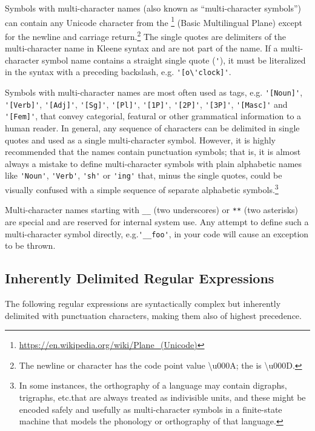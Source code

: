 \vspace{.5cm}

\noindent
Symbols with multi-character names (also known as ``multi-character symbols'') can contain any
Unicode character from the
\footnote{\url{https://en.wikipedia.org/wiki/Plane_(Unicode)}}
(Basic Multilingual Plane) except for the newline and
carriage return.\footnote{The newline or  character has the code
point value \textbackslash{}u000A; the  is \textbackslash{}u000D.}  The
single quotes are delimiters of the multi-character 
name in Kleene syntax and are not part of the name.  If a
multi-character symbol name contains a straight single quote
(\verb!'!), it must be literalized in the syntax with a preceding backslash, e.g.\@
\verb!'[o\'clock]'!.

Symbols with multi-character names are most often used as tags, e.g.\@
\verb!'[Noun]'!, \verb!'[Verb]'!, \verb!'[Adj]'!, \verb!'[Sg]'!,
\verb!'[Pl]'!, \verb!'[1P]'!, \verb!'[2P]'!, \verb!'[3P]'!,
\verb!'[Masc]'! and \verb!'[Fem]'!, that convey categorial,
featural or other grammatical information to a human reader.  In general, any sequence of
 characters can be delimited in single quotes and used as a
single multi-character symbol.  However, it is highly recommended that
the names contain punctuation symbols; that is, it is almost always a
mistake to define multi-character symbols with plain alphabetic names
like \verb!'Noun'!, \verb!'Verb'!, \verb!'sh'! or \verb!'ing'! that, 
minus the single quotes, could be visually confused with a simple
sequence of separate alphabetic symbols.\footnote{In some instances, the
orthography of a language may contain digraphs, trigraphs, etc.\@ that
are always treated as indivisible units, and these might be encoded
safely and usefully as multi-character symbols in a finite-state machine
that models the phonology or orthography of that language.}

Multi-character names starting with \verb!__! (two underscores) or
\verb!**! (two asterisks) are special and are reserved for internal
system use.  Any attempt to define such a multi-character symbol
directly, e.g.\@ \verb!'__foo'!, in your code will cause an exception to be
thrown.

\subsection{Inherently Delimited Regular Expressions}

The following regular expressions are syntactically complex but
inherently delimited with punctuation characters, making them also of highest precedence.

